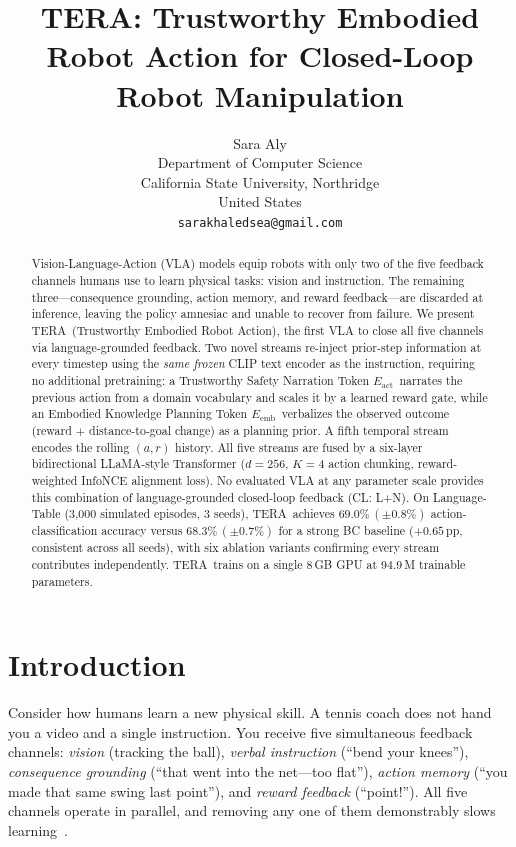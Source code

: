 \documentclass{article}
\title{TERA: Trustworthy Embodied Robot Action for Closed-Loop Robot Manipulation}
\author{
  Sara Aly\\
  Department of Computer Science\\
  California State University, Northridge\\
  United States\\
  \texttt{sarakhaledsea@gmail.com}
}
\newcommand{\modelname}{\textsc{TERA}\xspace}
\newcommand{\terafullname}{Trustworthy Embodied Robot Action}
\newcommand{\Lact}{$E_{\mathrm{act}}$\xspace}
\newcommand{\Lexp}{$E_{\mathrm{emb}}$\xspace}
\begin{document}
\maketitle

\begin{abstract}
Vision-Language-Action (VLA) models equip robots with only two of the five
feedback channels humans use to learn physical tasks: vision and instruction.
The remaining three---consequence grounding, action memory, and reward feedback---are
discarded at inference, leaving the policy amnesiac and unable to recover from
failure.
We present \modelname\ (\terafullname), the first VLA to close all five channels
via language-grounded feedback.
Two novel streams re-inject prior-step information at every timestep using the
\emph{same frozen} CLIP text encoder as the instruction, requiring no additional
pretraining: a Trustworthy Safety Narration Token \Lact\ narrates the previous
action from a domain vocabulary and scales it by a learned reward gate, while an
Embodied Knowledge Planning Token \Lexp\ verbalizes the observed outcome
(reward $+$ distance-to-goal change) as a planning prior.
A fifth temporal stream encodes the rolling $(a, r)$ history.
All five streams are fused by a six-layer bidirectional LLaMA-style Transformer
($d{=}256$, $K{=}4$ action chunking, reward-weighted InfoNCE alignment loss).
No evaluated VLA at any parameter scale provides this combination of
language-grounded closed-loop feedback (CL: L+N).
On Language-Table (3,000 simulated episodes, 3 seeds), \modelname\ achieves
$69.0\%\,(\pm0.8\%)$ action-classification accuracy versus $68.3\%\,(\pm0.7\%)$
for a strong BC baseline ($+0.65$\,pp, consistent across all seeds), with six
ablation variants confirming every stream contributes independently.
\modelname\ trains on a single 8\,GB GPU at 94.9\,M trainable parameters.
\end{abstract}


\section{Introduction}
\label{sec:intro}

Consider how humans learn a new physical skill.
A tennis coach does not hand you a video and a single instruction.
You receive five simultaneous feedback channels: \emph{vision} (tracking the
ball), \emph{verbal instruction} (``bend your knees''), \emph{consequence
grounding} (``that went into the net---too flat''), \emph{action memory}
(``you made that same swing last point''), and \emph{reward feedback}
(``point!'').
All five channels operate in parallel, and removing any one of them demonstrably
slows learning~\citep{magill2010motor}.
\end{document}
